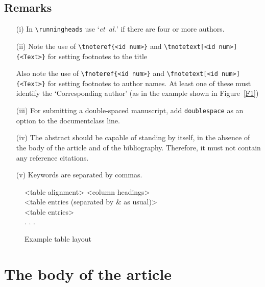 \documentclass[fonts]{icst}
\begin{document}
\subsection{Remarks}
\begin{enumerate}
\item[(i)] In \verb"\runningheads" use `\emph{et~al.}' if there
are four or more authors.

\item[(ii)] Note the use of \verb"\tnoteref{<id num>}" and \verb "\tnotetext[<id num>]{<Text>}" for setting footnotes to the title

Also note the use of \verb"\fnoteref{<id num>}" and
\verb"\fnotetext[<id num>]{<Text>}" for setting footnotes to author names. At
least one of these must identify the `Corresponding author' (as in the example shown in Figure~\ref{F1})

\item[(iii)] For submitting a double-spaced manuscript, add
\verb"doublespace" as an option to the documentclass line.

\item[(iv)] The abstract should be capable of standing by itself,
in the absence of the body of the article and of the bibliography.
Therefore, it must not contain any reference citations.

\item[(v)] Keywords are separated by commas.
\end{enumerate}

\begin{figure}
\setlength{\fboxsep}{0pt}%
\setlength{\fboxrule}{0pt}%
\begin{center}
\begin{boxedverbatim}
\begin{table}\small\sf
\caption{<Table caption>}
\centering
\begin{tabular}{<table alignment>}
\toprule
<column headings>\\
\midrule
<table entries
(separated by & as usual)>\\
<table entries>\\
.
.
.\\
\bottomrule
\end{tabular}
\end{table}
\end{boxedverbatim}
\end{center}
\caption{Example table layout\label{F2}}
\end{figure}

\section{The body of the article}
\end{document}
